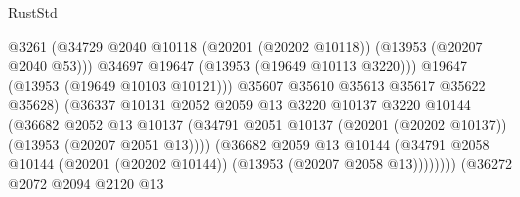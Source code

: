 \begin{lexlean}{RustStd}
\begin{coremodule}
                                              @3261
                                              (@34729
                                                @2040
                                                @10118
                                                (@20201 (@20202 @10118))
                                                (@13953 (@20207 @2040 @53)))
                                              @34697
                                              @19647
                                              (@13953 (@19649 @10113 @3220)))
                                            @19647
                                            (@13953 (@19649 @10103 @10121)))
                                          @35607
                                          @35610
                                          @35613
                                          @35617
                                          @35622
                                          @35628)
                                        (@36337
                                          @10131
                                          @2052
                                          @2059
                                          @13
                                          @3220
                                          @10137
                                          @3220
                                          @10144
                                          (@36682
                                            @2052
                                            @13
                                            @10137
                                            (@34791
                                              @2051
                                              @10137
                                              (@20201 (@20202 @10137))
                                              (@13953 (@20207 @2051 @13))))
                                          (@36682
                                            @2059
                                            @13
                                            @10144
                                            (@34791
                                              @2058
                                              @10144
                                              (@20201 (@20202 @10144))
                                              (@13953 (@20207 @2058 @13))))))))
                                  (@36272
                                    @2072
                                    @2094
                                    @2120
                                    @13

\end{coremodule}
\end{lexlean}
